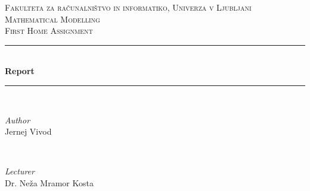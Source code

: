 \documentclass{article}
\begin{document}
\begin{titlepage} %
	\newcommand{\HRule}{\rule{\linewidth}{0.5mm}} %
	
	\center %
	
	
	\textsc{\LARGE Fakulteta za računalništvo in informatiko, Univerza v Ljubljani}\\[1.5cm] %
	
	\textsc{\Large Mathematical Modelling}\\[0.5cm] %
	
	\textsc{\large First Home Assignment}\\[0.5cm] %
	
	
	\HRule\\[0.4cm]
	
	{\huge\bfseries Report}\\[0.4cm] %
	
	\HRule\\[1.5cm]
	
	
	\begin{minipage}{0.4\textwidth}
		\begin{flushleft}
			\large
			\textit{Author}\\
			Jernej Vivod %
		\end{flushleft}
	\end{minipage}
	~
	\begin{minipage}{0.4\textwidth}
		\begin{flushright}
			\large
			\textit{Lecturer}\\
			Dr. Neža Mramor Kosta
		\end{flushright}
	\end{minipage}
	
	

\end{titlepage}
\end{document}
